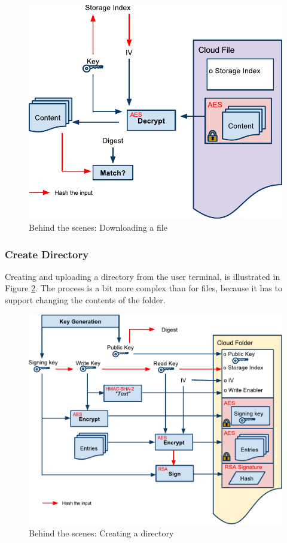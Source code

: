 \documentclass[pdftex,english,10pt,b5paper,twoside]{book}
\begin{document}
\begin{figure}[h!]
    \centering
    \includegraphics[width=\columnwidth]{CryptoOpenFile.pdf}
    \caption{Behind the scenes: Downloading a file}
    \label{fig:CS:OF}
\end{figure}

\subsubsection{Create Directory}

Creating and uploading a directory from the user terminal, is illustrated in
Figure \ref{fig:CS:CD}. The process is a bit more complex than for files,
because it has to support changing the contents of the folder.

\begin{figure}[h!]
    \centering
        \includegraphics[width=\columnwidth]{CryptoCreateFolder.pdf}
	    \caption{Behind the scenes: Creating a directory}
    \label{fig:CS:CD}
\end{figure}
\end{document}

